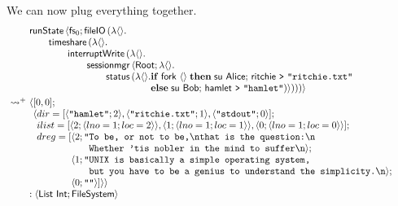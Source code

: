 \documentclass[12pt,phd,lfcs,twoside,openright,logo,leftchapter,normalheadings]{infthesis}
\theoremstyle{plain}
\theoremstyle{definition}
\begin{document}
We can now plug everything together.
%
\[
  \ba{@{~}l@{~}l}
    &\bl
    \runState\,\Record{\dec{fs}_0;\fileIO\,(\lambda\Unit.\\
         \qquad\timeshare\,(\lambda\Unit.\\
         \qquad\qquad\dec{interruptWrite}\,(\lambda\Unit.\\
         \qquad\qquad\qquad\sessionmgr\,\Record{\Root;\lambda\Unit.\\
         \qquad\qquad\qquad\qquad\status\,(\lambda\Unit.
                 \ba[t]{@{}l}
                   \If\;\fork~\Unit\;\Then\;
                       \su~\Alice;\,
                       \quoteRitchie~\redirect~\strlit{ritchie.txt}\\
                   \Else\;
                       \su~\Bob;\,
                       \quoteHamlet~\redirect~\strlit{hamlet})})))}
                 \ea
     \el \smallskip\\
     \reducesto^+&
     \bl
      \Record{
       \ba[t]{@{}l}
       [0, 0];\\
       \Record{
         \ba[t]{@{}l}
           dir=[\Record{\strlit{hamlet};2},
                \Record{\strlit{ritchie.txt};1},
                \Record{\strlit{stdout};0}];\\
           ilist=[\Record{2;\Record{lno=1;loc=2}},
                  \Record{1;\Record{lno=1;loc=1}},
                  \Record{0;\Record{lno=1;loc=0}}];\\
           dreg=[
             \ba[t]{@{}l}
               \Record{2;
                 \ba[t]{@{}l@{}l}
                   \texttt{"}&\texttt{To be, or not to be,\nl{}that is the question:\nl{}}\\
                             &\texttt{Whether 'tis nobler in the mind to suffer\nl{}}};
                 \ea\\
               \Record{1;
                 \ba[t]{@{}l@{}l}
                   \texttt{"}&\texttt{UNIX is basically a simple operating system, }\\
                             &\texttt{but you have to be a genius to understand the simplicity.\nl{}}};
                 \ea\\
               \Record{0; \strlit{}}]}}
           \ea
         \ea
       \ea\\
       : \Record{\List~\Int; \FileSystem}
     \el
  \ea
\]
\end{document}

